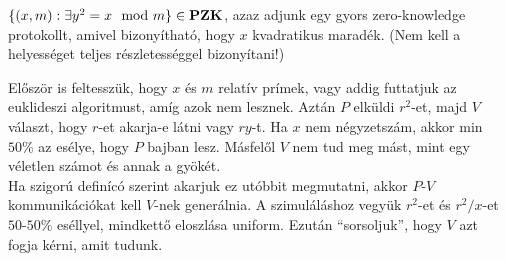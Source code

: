 \begin{Exercise}[counter={sorszam}, difficulty=0]
	$\{(x,m): \exists y^2=x \mod m\}\in {\mbox{\ensuremath{\mathbf{PZK}}}}$, azaz adjunk egy gyors zero-knowledge protokollt, amivel bizony\'ithat\'o, hogy $x$ kvadratikus marad\'ek. (Nem kell a helyess\'eget teljes r\'eszletess\'eggel bizony\'itani!)
\end{Exercise}	
\begin{Answer}
	El\H osz\"or is feltessz\"uk, hogy $x$ \'es $m$ relat\'iv pr\'imek, vagy addig futtatjuk az euklideszi algoritmust, am\'ig azok nem lesznek.
	Azt\'an $P$ elk\"uldi $r^2$-et, majd $V$ v\'alaszt, hogy $r$-et akarja-e l\'atni vagy $ry$-t.
	Ha $x$ nem n\'egyzetsz\'am, akkor min $50\%$ az es\'elye, hogy $P$ bajban lesz.
	M\'asfel\H ol $V$ nem tud meg m\'ast, mint egy v\'eletlen sz\'amot \'es annak a gy\"ok\'et.\\	
	Ha szigor\'u defin\'ic\'o szerint akarjuk ez ut\'obbit megmutatni, akkor $P$-$V$ kommunik\'aci\'okat kell $V$-nek gener\'alnia. A szimul\'al\'ashoz vegy\"uk $r^2$-et \'es $r^2/x$-et $50$-$50\%$ es\'ellyel, mindkett\H o eloszl\'asa uniform.
	Ezut\'an ``sorsoljuk'', hogy $V$ azt fogja k\'erni, amit tudunk. 
\end{Answer}





